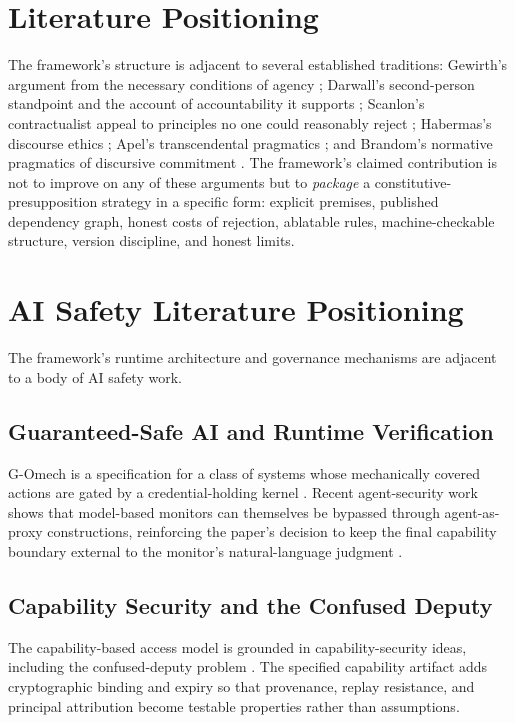 \documentclass[11pt]{article}
\def\textsuperscript#1{#1}%
\newcommand{\Gmech}{G-O\textsuperscript{mech}}
\begin{document}
\section{Literature Positioning}\label{app:literature}
The framework's structure is adjacent to several established traditions: Gewirth's argument from the necessary conditions of agency \cite{gewirth}; Darwall's second-person standpoint and the account of accountability it supports \cite{darwall}; Scanlon's contractualist appeal to principles no one could reasonably reject \cite{scanlon}; Habermas's discourse ethics \cite{habermas}; Apel's transcendental pragmatics \cite{apel}; and Brandom's normative pragmatics of discursive commitment \cite{brandom}. The framework's claimed contribution is not to improve on any of these arguments but to \emph{package} a constitutive-presupposition strategy in a specific form: explicit premises, published dependency graph, honest costs of rejection, ablatable rules, machine-checkable structure, version discipline, and honest limits.

\section{AI Safety Literature Positioning}\label{app:ai-safety}
The framework's runtime architecture and governance mechanisms are adjacent to a body of AI safety work.
\subsection{Guaranteed-Safe AI and Runtime Verification}
\Gmech{} is a specification for a class of systems whose mechanically covered actions are gated by a credential-holding kernel \cite{seshia,bartocci-falcone}. Recent agent-security work shows that model-based monitors can themselves be bypassed through agent-as-proxy constructions, reinforcing the paper's decision to keep the final capability boundary external to the monitor's natural-language judgment \cite{agentproxy}.

\subsection{Capability Security and the Confused Deputy}
The capability-based access model is grounded in capability-security ideas, including the confused-deputy problem \cite{hardy}. The specified capability artifact adds cryptographic binding and expiry so that provenance, replay resistance, and principal attribution become testable properties rather than assumptions.
\end{document}
